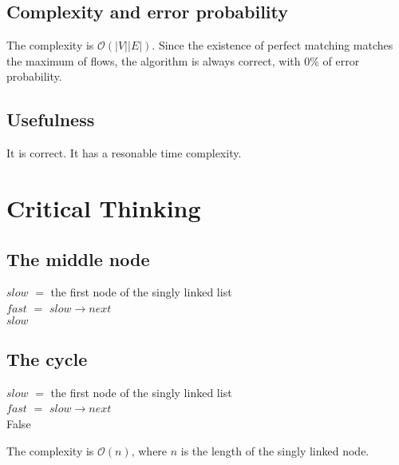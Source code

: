 \documentclass[12pt,a4paper]{article}
\theoremstyle{definition}
\begin{document}
\subsection{Complexity and error probability}
The complexity is $\mathcal{O}(|V||E|)$. Since the existence of perfect matching matches the maximum of flows, the algorithm is always correct, with 0\% of error probability.
\subsection{Usefulness}
It is correct. It has a resonable time complexity.
\section{Critical Thinking}
\subsection{The middle node}
\begin{algorithm}[H]
    $slow$ $=$ the first node of the singly linked list \\
    $fast$ $=$ $slow \rightarrow next$ \\
    \Return $slow$
\end{algorithm}
\subsection{The cycle}
\begin{algorithm}[H]
    $slow$ $=$ the first node of the singly linked list \\
    $fast$ $=$ $slow \rightarrow next$ \\
    \Return False
\end{algorithm}
The complexity is $\mathcal{O}(n)$, where $n$ is the length of the singly linked node.
\end{document}
